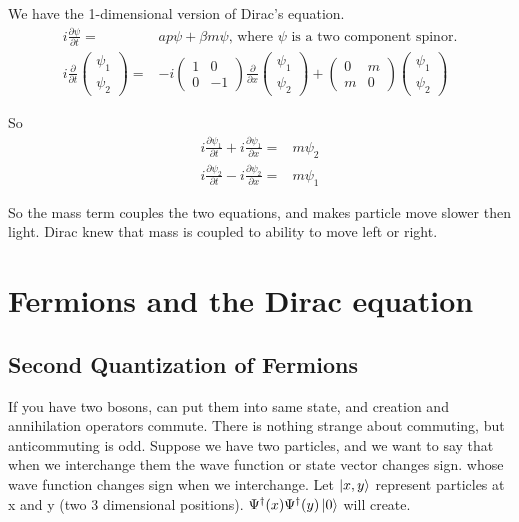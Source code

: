 \documentclass[]{article}
\begin{document}
We have the 1-dimensional version of Dirac's equation.
\begin{align*}
	i \frac{\partial \psi}{\partial t}=& a p \psi + \beta m \psi \text{, where $\psi$ is a two component spinor.}\\
	i \frac{\partial}{\partial t}\begin{pmatrix}
	\psi_1\\
	\psi_2
	\end{pmatrix}=&-i \begin{pmatrix}
	1&0\\
	0&-1
	\end{pmatrix} \frac{\partial}{\partial x}\begin{pmatrix}
	\psi_1\\
	\psi_2
	\end{pmatrix} + \begin{pmatrix}
	0&m\\
	m&0
	\end{pmatrix}\begin{pmatrix}
	\psi_1\\
	\psi_2
	\end{pmatrix}
\end{align*}

So
\begin{align*}
	i\frac{\partial \psi_1}{\partial t} + i\frac{\partial \psi_1}{\partial x}=&m \psi_2\\
	i\frac{\partial \psi_2}{\partial t} - i\frac{\partial \psi_2}{\partial x}=&m \psi_1
\end{align*}

So the mass term couples the two equations, and makes particle move slower then light. Dirac knew that mass is coupled to ability to move left or right.

\section{Fermions and the Dirac equation}\label{section:fermions:dirac}

\subsection{Second Quantization of Fermions}

If you have two bosons, can put them into same state, and creation and annihilation operators commute. There is nothing strange about commuting, but anticommuting is odd. Suppose we have two particles, and we want to say that when we interchange them the wave function or state vector changes sign.  whose wave function changes sign when we interchange. Let $\ket{x,y}$ represent particles at x and y (two 3 dimensional positions). $\Psi^\dagger(x)\Psi^\dagger(y)\ket{0}$ will create.
\end{document}
